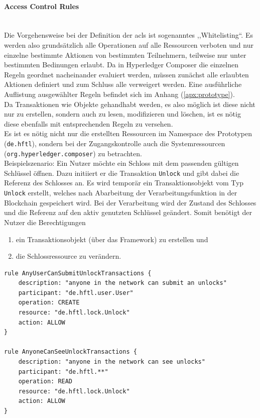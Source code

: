         \newpage
        \paragraph{\textrm{Access Control Rules}}\hspace{0cm}\\
            Die Vorgehensweise bei der Definition der \gls{acl}s ist sogenanntes ,,Whitelisting``. 
            Es werden also grundsätzlich alle Operationen auf alle Ressourcen verboten und nur einzelne bestimmte Aktionen von bestimmten Teilnehmern, teilweise nur unter bestimmten Bedinungen erlaubt. 
            Da in Hyperledger Composer die einzelnen Regeln geordnet nacheinander evaluiert werden, müssen zunächst alle erlaubten Aktionen definiert und zum Schluss alle verweigert werden. 
            Eine ausführliche Auflistung ausgewählter Regeln befindet sich im Anhang (\ref{apx:prototype}).
            \medskip\\
            Da Transaktionen wie Objekte gehandhabt werden, es also möglich ist diese nicht nur zu erstellen, sondern auch zu lesen, modifizieren und löschen, ist es nötig diese ebenfalls mit entsprechenden Regeln zu versehen.\\
            Es ist es nötig nicht nur die erstellten Ressourcen im Namespace des Prototypen (\colorbox{light-gray}{\lstinline{de.hftl}}), sondern bei der Zugangskontrolle auch die Systemressourcen (\sloppy\colorbox{light-gray}{\lstinline{org.hyperledger.composer}}) zu betrachten.
            \medskip\\
            Beispielszenario: Ein Nutzer möchte ein Schloss mit dem passenden gültigen Schlüssel öffnen.
            Dazu initiiert er die Transaktion \colorbox{light-gray}{\lstinline{Unlock}} und gibt dabei die Referenz des Schlosses an.
            Es wird temporär ein Transaktionsobjekt vom Typ \colorbox{light-gray}{\lstinline{Unlock}} erstellt, welches nach Abarbeitung der Verarbeitungsfunktion in der Blockchain gespeichert wird. 
            Bei der Verarbeitung wird der Zustand des Schlosses und die Referenz auf den aktiv genutzten Schlüssel geändert. 
            Somit benötigt der Nutzer die Berechtigungen
            \begin{enumerate}[noitemsep]
                \item ein Transaktionsobjekt (über das Framework) zu erstellen und
                \item die Schlossressource zu verändern.
            \end{enumerate}
            \begin{lstlisting}[caption={Auszug aus den Regeln für die Transaktion \colorbox{light-gray}{\lstinline{Unlock}}},label=prototype_rule_unlock,captionpos=b]
rule AnyUserCanSubmitUnlockTransactions {
    description: "anyone in the network can submit an unlocks"
    participant: "de.hftl.user.User"
    operation: CREATE
    resource: "de.hftl.lock.Unlock"
    action: ALLOW
}

rule AnyoneCanSeeUnlockTransactions {
    description: "anyone in the network can see unlocks"
    participant: "de.hftl.**"
    operation: READ
    resource: "de.hftl.lock.Unlock"
    action: ALLOW
}
            \end{lstlisting}
